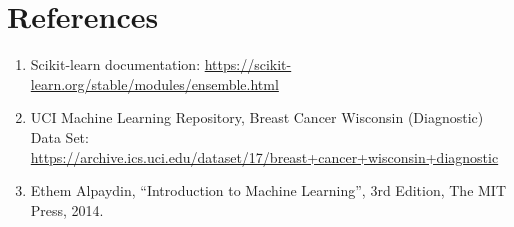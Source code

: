 \documentclass[12pt,a4paper]{article}
\begin{document}
\section{References}
\begin{enumerate}
\item Scikit-learn documentation: \url{https://scikit-learn.org/stable/modules/ensemble.html}
\item UCI Machine Learning Repository, Breast Cancer Wisconsin (Diagnostic) Data Set:
\url{https://archive.ics.uci.edu/dataset/17/breast+cancer+wisconsin+diagnostic}
\item Ethem Alpaydin, ``Introduction to Machine Learning'', 3rd Edition, The MIT Press, 2014.
\end{enumerate}
\end{document}
